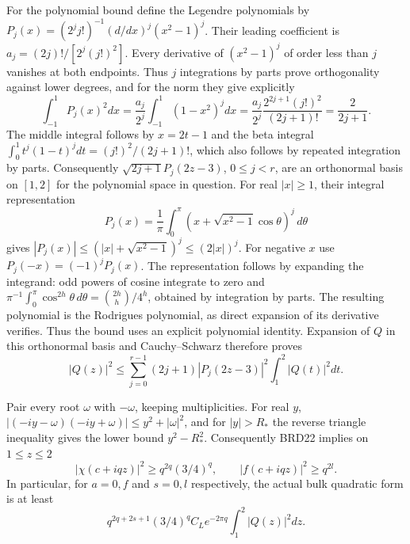 \documentclass[11pt,a4paper]{article}
\begin{document}
For the polynomial bound define the Legendre polynomials by
$P_j(x)=(2^j j!)^{-1}(d/dx)^j(x^2-1)^j$.
Their leading coefficient is
$a_j=(2j)!/[2^j(j!)^2]$. Every derivative of $(x^2-1)^j$
of order less than $j$ vanishes at both endpoints. Thus
$j$ integrations by parts prove orthogonality against lower
degrees, and for the norm they give explicitly
\[
 \int_{-1}^1P_j(x)^2dx
  =\frac{a_j}{2^j}\int_{-1}^1(1-x^2)^jdx
  =\frac{a_j}{2^j}
       \frac{2^{2j+1}(j!)^2}{(2j+1)!}
  =\frac2{2j+1}.
\]
The middle integral follows by $x=2t-1$ and the beta integral
$\int_0^1t^j(1-t)^jdt=(j!)^2/(2j+1)!$, which also follows
by repeated integration by parts. Consequently
$\sqrt{2j+1}P_j(2z-3)$, $0\leq j<r$, are an orthonormal
basis on $[1,2]$ for the polynomial space in question. For
real $|x|\geq1$, their integral representation
\[
 P_j(x)=\frac1\pi\int_0^\pi
            (x+\sqrt{x^2-1}\cos\theta)^j\,d\theta
\tag{BRD25}
\]
gives $|P_j(x)|\leq(|x|+\sqrt{x^2-1})^j\leq(2|x|)^j$.
For negative $x$ use $P_j(-x)=(-1)^jP_j(x)$.
The representation follows by expanding the integrand: odd
powers of cosine integrate to zero and
$\pi^{-1}\int_0^\pi\cos^{2h}\theta\,d\theta
=\binom{2h}{h}/4^h$, obtained by integration by parts.
The resulting polynomial is the Rodrigues polynomial, as
direct expansion of its derivative verifies. Thus the bound
uses an explicit polynomial identity.
Expansion of $Q$ in this orthonormal basis and Cauchy--Schwarz
therefore proves
\[
 |Q(z)|^2\leq
 \sum_{j=0}^{r-1}(2j+1)|P_j(2z-3)|^2
                      \int_1^2|Q(t)|^2dt.
\tag{BRD26}
\]

Pair every root $\omega$ with $-\omega$, keeping multiplicities.
For real $y$,
$|(-iy-\omega)(-iy+\omega)|\leq y^2+|\omega|^2$,
and for $|y|>R_*$ the reverse triangle inequality gives the
lower bound $y^2-R_*^2$. Consequently BRD22 implies on $1\leq z\leq2$
\[
 |\chi(c+iqz)|^2\geq q^{2q}(3/4)^q,
 \qquad |f(c+iqz)|^2\geq q^{2l}.
\tag{BRD27}
\]
In particular, for $a=0,f$ and $s=0,l$ respectively, the actual
bulk quadratic form is at least
\[
 q^{2q+2s+1}(3/4)^q C_Le^{-2\pi q}
                           \int_1^2|Q(z)|^2dz.
\tag{BRD28}
\]
\end{document}
